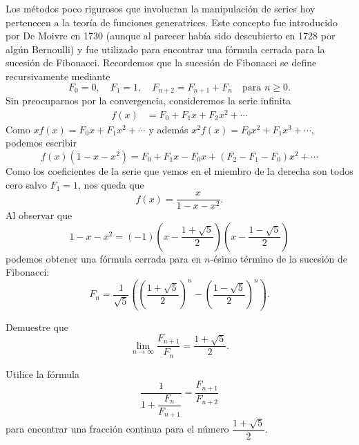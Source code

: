 Los métodos poco rigurosos que involucran la manipulación de series hoy pertenecen a la teoría de funciones generatrices. Este concepto 
fue introducido por De Moivre en 1730 (aunque al parecer había sido descubierto
en 1728 por algún Bernoulli)
y fue utilizado para encontrar una fórmula cerrada para la sucesión de Fibonacci. Recordemos que la sucesión de Fibonacci
se define recursivamente mediante 
\[
	F_0=0,\quad
	F_1=1,\quad
	F_{n+2}=F_{n+1}+F_n\quad\text{para $n\geq 0$}.
\]
Sin preocuparnos por la convergencia, 
consideremos la serie infinita
\begin{align*}
	f(x)&=F_0+F_1x+F_2x^2+\cdots
\end{align*}
Como $xf(x)=F_0x+F_1x^2+\cdots$ y además $x^2f(x)=F_0x^2+F_1x^3+\cdots$, podemos escribir
\[
	f(x)(1-x-x^2)=F_0+F_1x-F_0x+(F_2-F_1-F_0)x^2+\cdots
\]
Como los coeficientes de la serie que vemos en el miembro de la derecha son todos cero salvo $F_1=1$, nos queda
que
\[
	f(x)=\frac{x}{1-x-x^2}.
\]
Al observar que
\[
	1-x-x^2=(-1)\left(x-\frac{1+\sqrt{5}}{2}\right)\left(x-\frac{1-\sqrt{5}}{2}\right)
\]
podemos obtener una fórmula cerrada para en $n$-ésimo término de la sucesión de Fibonacci:
\[
	F_n=\frac{1}{\sqrt{5}}\left( \left(\frac{1+\sqrt{5}}{2}\right)^n-\left(\frac{1-\sqrt{5}}{2}\right)^n\right).
\]

\begin{exercise}
	Demuestre que 
	\[
		\lim_{n\to\infty}\frac{F_{n+1}}{F_n}=\frac{1+\sqrt{5}}{2}.
	\]
\end{exercise}

\begin{exercise}
	Utilice la fórmula
	\[
		\dfrac{1}{1+\dfrac{F_n}{F_{n+1}}}=\dfrac{F_{n+1}}{F_{n+2}}
	\]
	para encontrar una fracción continua para el número $\dfrac{1+\sqrt{5}}{2}$. 
\end{exercise}


